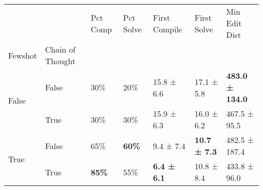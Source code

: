 \begin{tabular}{lllllll}
\toprule
 &  & Pct Comp & Pct Solve & First Compile & First Solve & Min Edit Dist \\
Fewshot & Chain of Thought &  &  &  &  &  \\
\midrule
\multirow[t]{2}{*}{False} & False & 30\% & 20\% & 15.8 ± 6.6 & 17.1 ± 5.8 & \textbf{483.0 ± 134.0} \\
 & True & 30\% & 30\% & 15.9 ± 6.3 & 16.0 ± 6.2 & 467.5 ± 95.5 \\
\cline{1-7}
\multirow[t]{2}{*}{True} & False & 65\% & \textbf{60\%} & 9.4 ± 7.4 & \textbf{10.7 ± 7.3} & 482.5 ± 187.4 \\
 & True & \textbf{85\%} & 55\% & \textbf{6.4 ± 6.1} & 10.8 ± 8.4 & 433.8 ± 96.0 \\
\cline{1-7}
\bottomrule
\end{tabular}
